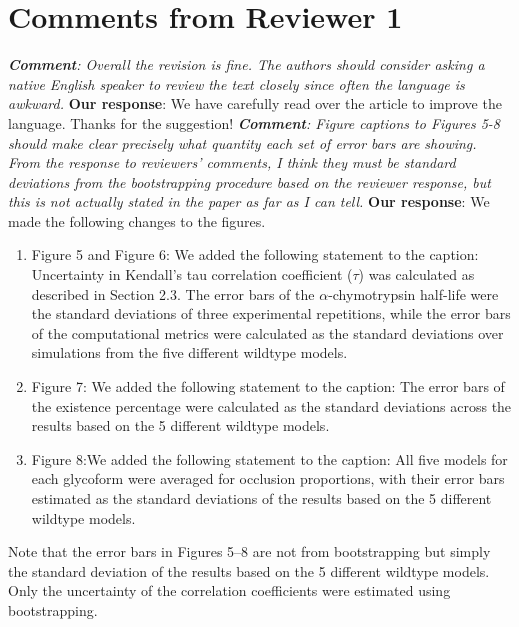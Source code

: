 \documentclass[sn-vancouver]{sn-jnl}
\begin{document}
\section*{Comments from Reviewer 1}
\textit{\textbf{Comment}: Overall the revision is fine. The authors should consider asking a native English speaker to review the text closely since often the language is awkward.} 
\newline
\indent
{\bf Our response}: We have carefully read over the article to improve the language. Thanks for the suggestion!
\newline
\newline
\indent
\textit{\textbf{Comment}: Figure captions to Figures 5-8 should make clear precisely what quantity each set of error bars are showing.  From the response to reviewers' comments, I think they must be standard deviations from the bootstrapping procedure based on the reviewer response, but this is not actually stated in the paper as far as I can tell. } 
\newline
\indent
{\bf Our response}: We made the following changes to the figures.
\begin{enumerate}[label={(\arabic*)}, leftmargin=5.0em]
    \item Figure 5 and Figure 6: We added the following statement to the caption: Uncertainty in Kendall's tau correlation coefficient ($\tau$) was calculated as described in Section 2.3. The error bars of the $\alpha$-chymotrypsin half-life were the standard deviations of three experimental repetitions, while the error bars of the computational metrics were calculated as the standard deviations over simulations from the five different wildtype models.
    \item Figure 7: We added the following statement to the caption: The error bars of the existence percentage were calculated as the standard deviations across the results based on the 5 different wildtype models.
    \item Figure 8:We added the following statement to the caption: All five models for each glycoform were averaged for occlusion proportions, with their error bars estimated as the standard deviations of the results based on the 5 different wildtype models.
\end{enumerate} 
\par Note that the error bars in Figures 5--8 are not from bootstrapping but simply the standard deviation of the results based on the 5 different wildtype models. Only the uncertainty of the correlation coefficients were estimated using bootstrapping.
\end{document}
